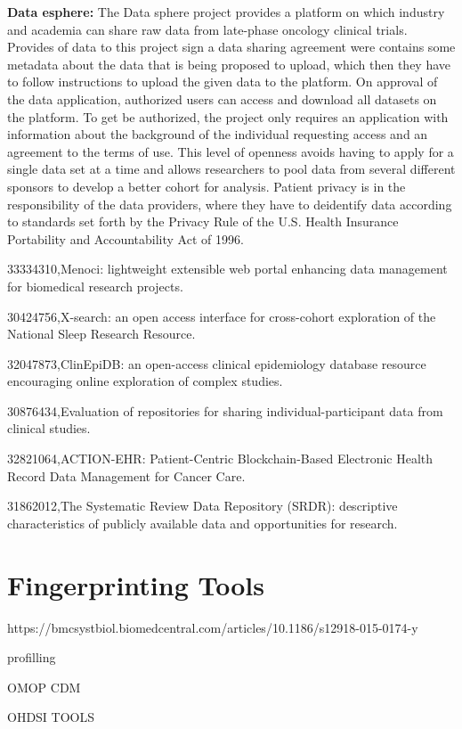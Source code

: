 \textbf{Data esphere:}
The Data sphere project provides a platform on which industry and academia can share
raw data from late-phase oncology clinical trials.
Provides of data to this project sign a data sharing agreement were contains some
metadata about the data that is being proposed to upload, which then they have to
follow instructions to upload the given data to the platform.
On approval of the data application, authorized users can access and download all
datasets on the platform.
To get be authorized, the project only requires an application with information about
the background of the individual requesting access and an agreement to the terms of
use.
This level of openness avoids having to apply for a single data set at a time and
allows researchers to pool data from several different sponsors to develop a better
cohort for analysis.
Patient privacy is in the responsibility of the data providers, where they have to
deidentify data according to standards set forth by the Privacy Rule of the U.S. Health
Insurance Portability and Accountability Act of 1996.

33334310,Menoci: lightweight extensible web portal enhancing data management for biomedical research projects.

30424756,X-search: an open access interface for cross-cohort exploration of the National Sleep Research Resource.

32047873,ClinEpiDB: an open-access clinical epidemiology database resource encouraging online exploration of complex studies.

30876434,Evaluation of repositories for sharing individual-participant data from clinical studies.

32821064,ACTION-EHR: Patient-Centric Blockchain-Based Electronic Health Record Data Management for Cancer Care.

31862012,The Systematic Review Data Repository (SRDR): descriptive characteristics of publicly available data and opportunities for research.

\section{Fingerprinting Tools}

https://bmcsystbiol.biomedcentral.com/articles/10.1186/s12918-015-0174-y

\cite{maelstrom}

profilling

OMOP CDM

OHDSI TOOLS 

